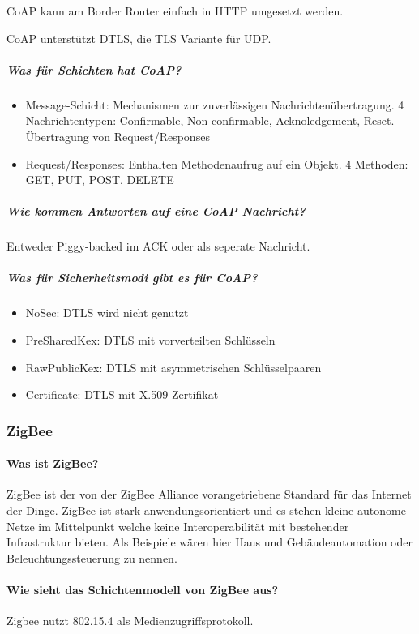 	CoAP kann am Border Router einfach in HTTP umgesetzt werden.
	
	CoAP unterstützt DTLS, die TLS Variante für UDP.
	
	\subparagraph{Was für Schichten hat CoAP?}
	\begin{itemize}
		\item Message-Schicht: Mechanismen zur zuverlässigen Nachrichtenübertragung. 4 Nachrichtentypen: Confirmable, Non-confirmable, Acknoledgement, Reset. Übertragung von Request/Responses
		\item Request/Responses: Enthalten Methodenaufrug auf ein Objekt. 4 Methoden: GET, PUT, POST, DELETE
	\end{itemize}
	
	\subparagraph{Wie kommen Antworten auf eine CoAP Nachricht?}
	Entweder Piggy-backed im ACK oder als seperate Nachricht.
	
	\subparagraph{Was für Sicherheitsmodi gibt es für CoAP?}
	\begin{itemize}
		\item NoSec: DTLS wird nicht genutzt
		\item PreSharedKex: DTLS mit vorverteilten Schlüsseln
		\item RawPublicKex: DTLS mit asymmetrischen Schlüsselpaaren
		\item Certificate: DTLS mit X.509 Zertifikat
	\end{itemize}
	
\subsubsection{ZigBee}
	\paragraph{Was ist ZigBee?}
	ZigBee ist der von der ZigBee Alliance vorangetriebene Standard für das Internet der Dinge. ZigBee ist stark anwendungsorientiert und es stehen kleine autonome Netze im Mittelpunkt welche keine Interoperabilität mit bestehender Infrastruktur bieten.
	Als Beispiele wären hier Haus und Gebäudeautomation oder Beleuchtungssteuerung zu nennen.
	
	\paragraph{Wie sieht das Schichtenmodell von ZigBee aus?}
	Zigbee nutzt 802.15.4 als Medienzugriffsprotokoll.
	
	
	
	
	
	
	
	
			
	
	
	
	